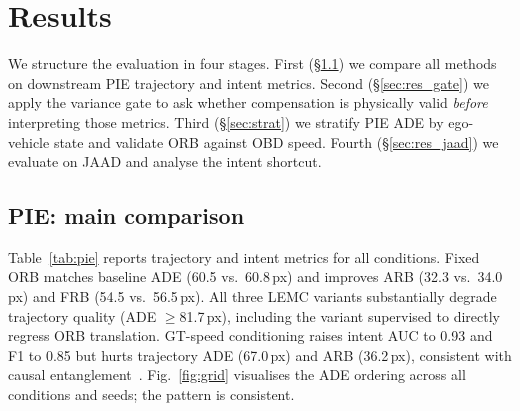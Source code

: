 \documentclass[conference]{IEEEtran}
\begin{document}
\FloatBarrier
\newpage

\section{Results}
\label{sec:results}

We structure the evaluation in four stages.
First (\S\ref{sec:res_pie}) we compare all methods on downstream PIE trajectory and intent metrics.
Second (\S\ref{sec:res_gate}) we apply the variance gate to ask whether compensation is physically valid \emph{before} interpreting those metrics.
Third (\S\ref{sec:strat}) we stratify PIE ADE by ego-vehicle state and validate ORB against OBD speed.
Fourth (\S\ref{sec:res_jaad}) we evaluate on JAAD and analyse the intent shortcut.

\subsection{PIE: main comparison}
\label{sec:res_pie}

Table~\ref{tab:pie} reports trajectory and intent metrics for all conditions.
Fixed ORB matches baseline ADE (60.5 vs.\ 60.8\,px) and improves ARB (32.3 vs.\ 34.0\,px) and FRB (54.5 vs.\ 56.5\,px).
All three LEMC variants substantially degrade trajectory quality (ADE $\geq$81.7\,px), including the variant supervised to directly regress ORB translation.
GT-speed conditioning raises intent AUC to 0.93 and F1 to 0.85 but hurts trajectory ADE (67.0\,px) and ARB (36.2\,px), consistent with causal entanglement~\cite{lim2025tits}.
Fig.~\ref{fig:grid} visualises the ADE ordering across all conditions and seeds; the pattern is consistent.
\end{document}
